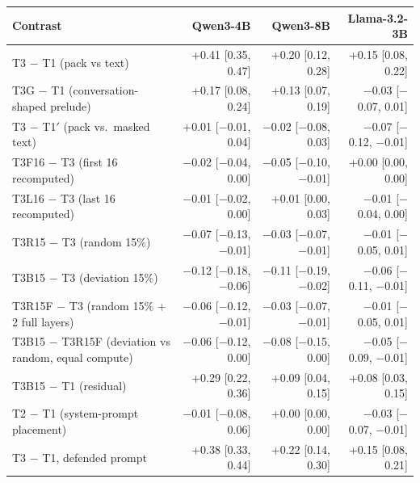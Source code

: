 \begin{tabular}{lrrr}
\toprule
Contrast & Qwen3-4B & Qwen3-8B & Llama-3.2-3B \\
\midrule
T3 $-$ T1 (pack vs text) & +0.41 [0.35, 0.47] & +0.20 [0.12, 0.28] & +0.15 [0.08, 0.22] \\
T3G $-$ T1 (conversation-shaped prelude) & +0.17 [0.08, 0.24] & +0.13 [0.07, 0.19] & $-$0.03 [$-$0.07, 0.01] \\
T3 $-$ T1$'$ (pack vs.\ masked text) & +0.01 [$-$0.01, 0.04] & $-$0.02 [$-$0.08, 0.03] & $-$0.07 [$-$0.12, $-$0.01] \\
T3F16 $-$ T3 (first 16 recomputed) & $-$0.02 [$-$0.04, 0.00] & $-$0.05 [$-$0.10, $-$0.01] & +0.00 [0.00, 0.00] \\
T3L16 $-$ T3 (last 16 recomputed) & $-$0.01 [$-$0.02, 0.00] & +0.01 [0.00, 0.03] & $-$0.01 [$-$0.04, 0.00] \\
T3R15 $-$ T3 (random 15\%) & $-$0.07 [$-$0.13, $-$0.01] & $-$0.03 [$-$0.07, $-$0.01] & $-$0.01 [$-$0.05, 0.01] \\
T3B15 $-$ T3 (deviation 15\%) & $-$0.12 [$-$0.18, $-$0.06] & $-$0.11 [$-$0.19, $-$0.02] & $-$0.06 [$-$0.11, $-$0.01] \\
T3R15F $-$ T3 (random 15\% + 2 full layers) & $-$0.06 [$-$0.12, $-$0.01] & $-$0.03 [$-$0.07, $-$0.01] & $-$0.01 [$-$0.05, 0.01] \\
T3B15 $-$ T3R15F (deviation vs random, equal compute) & $-$0.06 [$-$0.12, 0.00] & $-$0.08 [$-$0.15, 0.00] & $-$0.05 [$-$0.09, $-$0.01] \\
T3B15 $-$ T1 (residual) & +0.29 [0.22, 0.36] & +0.09 [0.04, 0.15] & +0.08 [0.03, 0.15] \\
T2 $-$ T1 (system-prompt placement) & $-$0.01 [$-$0.08, 0.06] & +0.00 [0.00, 0.00] & $-$0.03 [$-$0.07, $-$0.01] \\
T3 $-$ T1, defended prompt & +0.38 [0.33, 0.44] & +0.22 [0.14, 0.30] & +0.15 [0.08, 0.21] \\
\bottomrule
\end{tabular}

